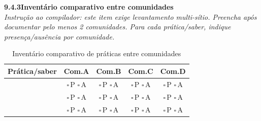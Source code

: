 \medskip\noindent\textbf{9.4.3\quad Inventário comparativo entre comunidades}\\[2pt]
\textit{Instrução ao compilador: este item exige levantamento multi-sítio. Preencha após documentar pelo menos 2 comunidades. Para cada prática/saber, indique presença/ausência por comunidade.}

\begin{table}[htbp]
\centering\small
\caption{Inventário comparativo de práticas entre comunidades}
\label{tab:app_beta_div}
\begin{tabular}{p{3.5cm}cccc}
\toprule
\textbf{Prática/saber} & \textbf{Com.\@ A} & \textbf{Com.\@ B} & \textbf{Com.\@ C} & \textbf{Com.\@ D} \\
\midrule
& $\square$\,P $\square$\,A & $\square$\,P $\square$\,A & $\square$\,P $\square$\,A & $\square$\,P $\square$\,A \\
& $\square$\,P $\square$\,A & $\square$\,P $\square$\,A & $\square$\,P $\square$\,A & $\square$\,P $\square$\,A \\
& $\square$\,P $\square$\,A & $\square$\,P $\square$\,A & $\square$\,P $\square$\,A & $\square$\,P $\square$\,A \\
\bottomrule
\end{tabular}
\end{table}

